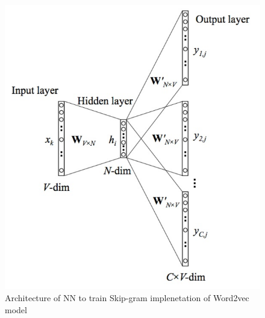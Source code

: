 \begin{figure}[!h]
	\centering
	
	\includegraphics[width=1\textwidth]{images/Skip_arch.png}
	
	\caption{Architecture of NN to train Skip-gram implenetation of Word2vec model \cite{skipgram}}
	\label{fig:skip_arch}
\end{figure}
\\ 